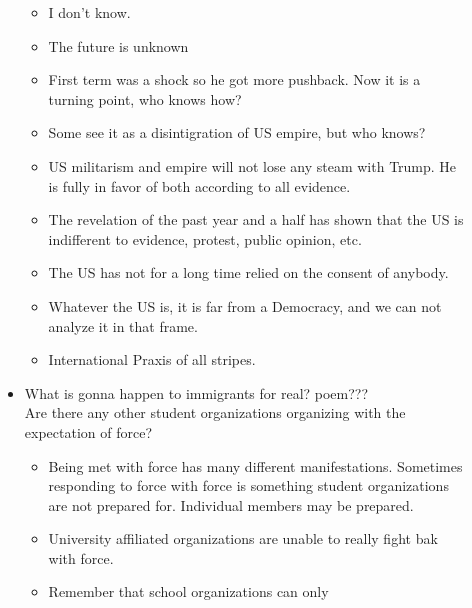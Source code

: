 \documentclass{report}
\begin{document}
\begin{description}
\begin{itemize}
                \begin{itemize}
                    \item I don't know.
                    \item The future is unknown
                    \item First term was a shock so he got more
                        pushback. Now it is a turning point, who
                        knows how?
                    \item Some see it as a disintigration of US
                        empire, but who knows?
                    \item US militarism and empire will not lose any
                        steam with Trump. He is fully in favor of
                        both according to all evidence.
                    \item The revelation of the past year and a half
                        has shown that the US is indifferent to
                        evidence, protest, public opinion, etc.
                    \item The US has not for a long time relied on
                        the consent of anybody. 
                    \item Whatever the US is, it is far from a
                        Democracy, and we can not analyze it in
                        that frame.
                    \item International Praxis of all stripes.
                \end{itemize}
            \item What is gonna happen to immigrants for real?
                poem???
                \\
                Are there any other student organizations organizing
                with the expectation of force?
                \begin{itemize}
                    \item Being met with force has many different
                        manifestations. Sometimes responding to
                        force with force is something student organizations
                        are not prepared for. Individual members
                        may be prepared.
                    \item University affiliated organizations are unable
                        to really fight bak with force.
                    \item Remember that school organizations can only

\end{itemize}
\end{itemize}
\end{description}
\end{document}
